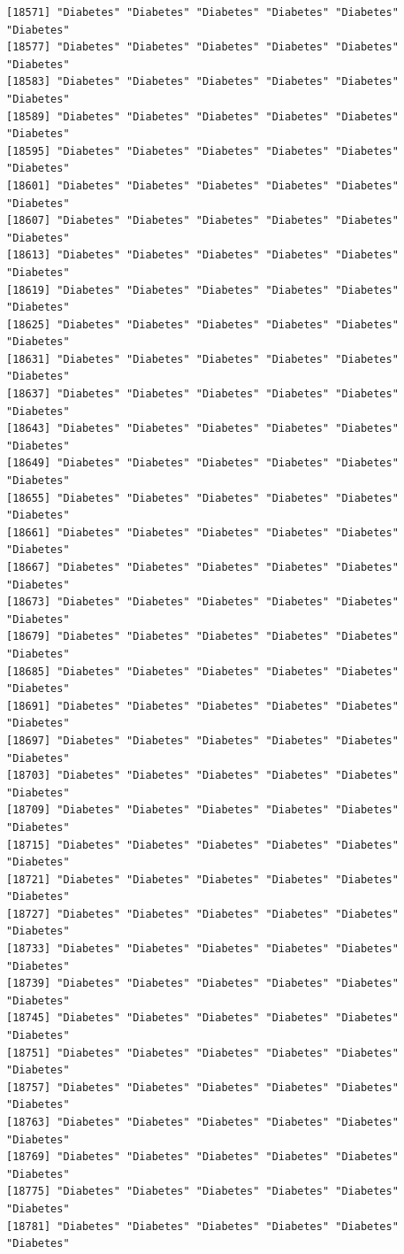 \documentclass[
  letterpaper,
  DIV=11,
  numbers=noendperiod]{scrartcl}
\begin{document}
\begin{verbatim}
[18571] "Diabetes" "Diabetes" "Diabetes" "Diabetes" "Diabetes" "Diabetes"
[18577] "Diabetes" "Diabetes" "Diabetes" "Diabetes" "Diabetes" "Diabetes"
[18583] "Diabetes" "Diabetes" "Diabetes" "Diabetes" "Diabetes" "Diabetes"
[18589] "Diabetes" "Diabetes" "Diabetes" "Diabetes" "Diabetes" "Diabetes"
[18595] "Diabetes" "Diabetes" "Diabetes" "Diabetes" "Diabetes" "Diabetes"
[18601] "Diabetes" "Diabetes" "Diabetes" "Diabetes" "Diabetes" "Diabetes"
[18607] "Diabetes" "Diabetes" "Diabetes" "Diabetes" "Diabetes" "Diabetes"
[18613] "Diabetes" "Diabetes" "Diabetes" "Diabetes" "Diabetes" "Diabetes"
[18619] "Diabetes" "Diabetes" "Diabetes" "Diabetes" "Diabetes" "Diabetes"
[18625] "Diabetes" "Diabetes" "Diabetes" "Diabetes" "Diabetes" "Diabetes"
[18631] "Diabetes" "Diabetes" "Diabetes" "Diabetes" "Diabetes" "Diabetes"
[18637] "Diabetes" "Diabetes" "Diabetes" "Diabetes" "Diabetes" "Diabetes"
[18643] "Diabetes" "Diabetes" "Diabetes" "Diabetes" "Diabetes" "Diabetes"
[18649] "Diabetes" "Diabetes" "Diabetes" "Diabetes" "Diabetes" "Diabetes"
[18655] "Diabetes" "Diabetes" "Diabetes" "Diabetes" "Diabetes" "Diabetes"
[18661] "Diabetes" "Diabetes" "Diabetes" "Diabetes" "Diabetes" "Diabetes"
[18667] "Diabetes" "Diabetes" "Diabetes" "Diabetes" "Diabetes" "Diabetes"
[18673] "Diabetes" "Diabetes" "Diabetes" "Diabetes" "Diabetes" "Diabetes"
[18679] "Diabetes" "Diabetes" "Diabetes" "Diabetes" "Diabetes" "Diabetes"
[18685] "Diabetes" "Diabetes" "Diabetes" "Diabetes" "Diabetes" "Diabetes"
[18691] "Diabetes" "Diabetes" "Diabetes" "Diabetes" "Diabetes" "Diabetes"
[18697] "Diabetes" "Diabetes" "Diabetes" "Diabetes" "Diabetes" "Diabetes"
[18703] "Diabetes" "Diabetes" "Diabetes" "Diabetes" "Diabetes" "Diabetes"
[18709] "Diabetes" "Diabetes" "Diabetes" "Diabetes" "Diabetes" "Diabetes"
[18715] "Diabetes" "Diabetes" "Diabetes" "Diabetes" "Diabetes" "Diabetes"
[18721] "Diabetes" "Diabetes" "Diabetes" "Diabetes" "Diabetes" "Diabetes"
[18727] "Diabetes" "Diabetes" "Diabetes" "Diabetes" "Diabetes" "Diabetes"
[18733] "Diabetes" "Diabetes" "Diabetes" "Diabetes" "Diabetes" "Diabetes"
[18739] "Diabetes" "Diabetes" "Diabetes" "Diabetes" "Diabetes" "Diabetes"
[18745] "Diabetes" "Diabetes" "Diabetes" "Diabetes" "Diabetes" "Diabetes"
[18751] "Diabetes" "Diabetes" "Diabetes" "Diabetes" "Diabetes" "Diabetes"
[18757] "Diabetes" "Diabetes" "Diabetes" "Diabetes" "Diabetes" "Diabetes"
[18763] "Diabetes" "Diabetes" "Diabetes" "Diabetes" "Diabetes" "Diabetes"
[18769] "Diabetes" "Diabetes" "Diabetes" "Diabetes" "Diabetes" "Diabetes"
[18775] "Diabetes" "Diabetes" "Diabetes" "Diabetes" "Diabetes" "Diabetes"
[18781] "Diabetes" "Diabetes" "Diabetes" "Diabetes" "Diabetes" "Diabetes"

\end{verbatim}
\end{document}
